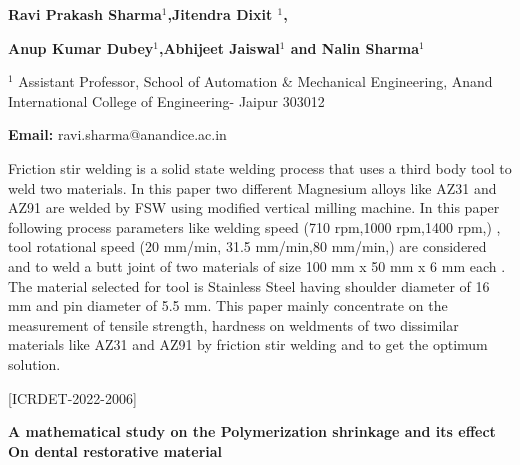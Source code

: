 \documentclass[twoside,11pt]{amsart}
\begin{document}
\centerline{\textbf{Ravi Prakash Sharma$^{1}$,Jitendra Dixit
$^{1}$, }}
\centerline{\textbf{Anup Kumar Dubey$^{1}$,Abhijeet Jaiswal$^{1}$ and Nalin Sharma$^{1}$}}
\vskip 5mm
\begin{flushleft}
$^{1}$ Assistant Professor, School of Automation \& Mechanical Engineering, Anand International College of Engineering- Jaipur 303012
\vskip 5mm
\end{flushleft}
\vskip 2mm
\begin{flushleft}
{\bf Email:} ravi.sharma@anandice.ac.in
\end{flushleft}
\vskip 5mm
Friction stir welding is a solid state welding process that uses a third body tool to weld two materials. In this paper two different Magnesium alloys like AZ31 and AZ91 are welded by FSW using modified vertical milling machine. In this paper following process parameters like welding speed (710 rpm,1000 rpm,1400 rpm,) , tool rotational speed (20 mm/min, 31.5 mm/min,80 mm/min,) are considered and to weld a butt joint of two materials of size 100 mm x 50 mm x 6 mm each . The material selected for tool is Stainless Steel having shoulder diameter of 16 mm and pin diameter of 5.5 mm. This paper mainly concentrate on the measurement of tensile strength, hardness on weldments of two dissimilar materials like AZ31 and AZ91 by friction stir welding and to get the optimum solution.
\newpage
\vskip 5mm
\begin{flushleft}
\centerline{[ICRDET-2022-2006]}
\end{flushleft}
\begin{center}\bf\LARGE
A mathematical study on the
Polymerization shrinkage and its effect
On dental restorative material
\end{center}
\vskip 5mm
\end{document}
